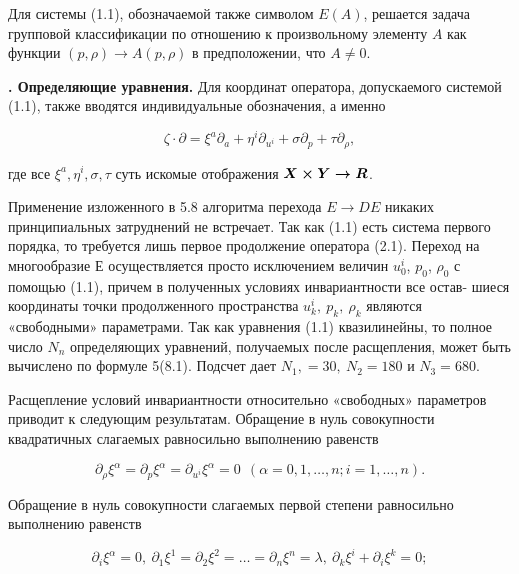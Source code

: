 \documentclass{report}
\newcounter{nrazd}
\newcommand{\razd}[1]{\addtocounter{nrazd}{1}
\setcounter{equation}{0}
\textbf{\thenrazd. #1}}
\newcommand{\bm}[1]{\mbox{\boldmath{\(#1\)}}}
\begin{document}
Для системы (1.1), обозначаемой также символом $E(A)$, решается задача групповой классификации по отношению к произвольному элементу $A$ как функции
$(p, \rho) \rightarrow A (p, \rho)$ в предположении, что $A \neq 0$.

\razd{Определяющие уравнения.} Для координат оператора, допускаемого
системой (1.1), также вводятся индивидуальные обозначения, а именно

\begin{equation} \label{eq2.1}
\zeta\cdot\partial=\xi^a \partial_a + \eta^i \partial_{u^i} + \sigma\partial_p + \tau\partial_\rho,
\end{equation}

\noindent где все $\xi^a, \eta^i, \sigma, \tau$ суть искомые отображения $\bm{X \times Y\rightarrow R}$.

Применение изложенного в 5.8 алгоритма перехода $E \rightarrow DE$
никаких принципиальных затруднений не встречает. Так как
(1.1) есть система первого порядка, то требуется лишь первое
продолжение оператора (2.1). Переход на многообразие Е осуществляется просто исключением величин $u^i_0$, $p_0$, $\rho_0$ с помощью
\newpage
\noindent (1.1), причем в полученных условиях инвариантности все остав-
шиеся координаты точки продолженного пространства $u^i_k, \ p_k, \ \rho_k  $ являются «свободными» параметрами. Так как уравнения (1.1)
квазилинейны, то полное число $N_n$ определяющих уравнений, получаемых после расщепления, может быть вычислено по формуле
5(8.1). Подсчет дает $N_1,=30,\ N_2=180$ и $N_3=680$.

Расщепление условий инвариантности относительно «свободных» параметров приводит к следующим результатам. Обращение в нуль совокупности квадратичных слагаемых равносильно
выполнению равенств

\begin{equation} \label{eq2.2}
        \partial_\rho \xi^\alpha = \partial_p \xi^\alpha = \partial_{u^i} \xi^\alpha = 0
        \ \ (\alpha = 0, 1, \ldots, n; i=1,\ldots,n).
\end{equation}

\noindent Обращение в нуль совокупности слагаемых первой степени равносильно выполнению равенств

\begin{equation} \label{eq2.3}
        \partial_i \xi^\alpha = 0, \ \partial_1 \xi^1 = \partial_2 \xi^2 = \ldots = \partial_n \xi^n = \lambda, \ \partial_k \xi^i + \partial_i \xi^k = 0;
\end{equation}
\end{document}
